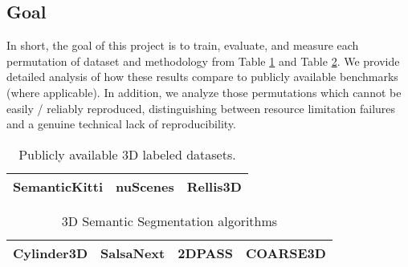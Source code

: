 \subsection{Goal}
\label{sec:goal}

In short, the goal of this project is to train, evaluate, and measure each permutation of dataset and methodology from Table \ref{tab:datasets} and Table \ref{tab:segmenters}. We provide detailed analysis of how these results compare to publicly available benchmarks (where applicable). In addition, we analyze those permutations which cannot be easily / reliably reproduced, distinguishing between resource limitation failures and a genuine technical lack of reproducibility.

\begin{table}[h!]
\begin{center}
\begin{tabular}{ |c|c|c| }
 \hline
  SemanticKitti \cite{semantickitti1} \cite{semantickitti2} & nuScenes \cite {nuscenes} & Rellis3D \cite{rellis3d} \\
 \hline
\end{tabular}
\caption{Publicly available 3D labeled datasets.}
\label{tab:datasets}
\end{center}
\end{table}

\begin{table}[h!]
\begin{center}
\begin{tabular}{ |c|c|c|c| }
 \hline
  Cylinder3D \cite{cylinder3d} & SalsaNext \cite{salsanext} & 2DPASS \cite{2dpass} & COARSE3D \cite{coarse3d} \\
 \hline
\end{tabular}
\end{center}
\caption{3D Semantic Segmentation algorithms}
\label{tab:segmenters}
\end{table}

